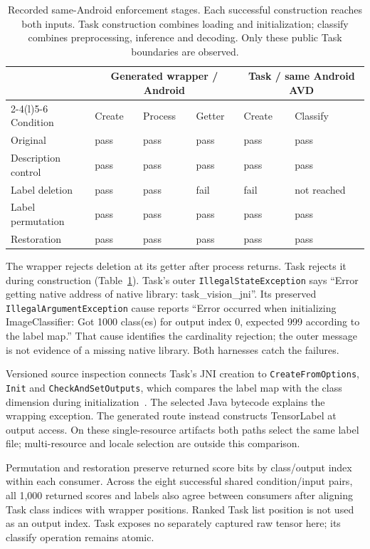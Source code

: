 \documentclass[10pt,twocolumn,letterpaper]{article}
\newcommand{\code}[1]{\texttt{#1}}
\begin{document}
\begin{table}[t]
\centering\small
\setlength{\tabcolsep}{9pt}
\begin{tabular}{@{}llllll@{}}
\toprule
 & \multicolumn{3}{c}{Generated wrapper / Android} & \multicolumn{2}{c}{Task / same Android AVD}\\
\cmidrule(lr){2-4}\cmidrule(l){5-6}
Condition & Create & Process & Getter & Create & Classify\\
\midrule
Original & pass & pass & pass & pass & pass\\
Description control & pass & pass & pass & pass & pass\\
Label deletion & pass & pass & fail & fail & not reached\\
Label permutation & pass & pass & pass & pass & pass\\
Restoration & pass & pass & pass & pass & pass\\
\bottomrule
\end{tabular}
\caption{Recorded same-Android enforcement stages. Each successful construction reaches both inputs. Task construction combines loading and initialization; classify combines preprocessing, inference and decoding. Only these public Task boundaries are observed.}
\label{tab:stages}
\end{table}

The wrapper rejects deletion at its getter after process returns. Task rejects it during construction (Table~\ref{tab:stages}). Task's outer \code{IllegalStateException} says ``Error getting native address of native library: task\_vision\_jni''. Its preserved \code{IllegalArgumentException} cause reports ``Error occurred when initializing ImageClassifier: Got 1000 class(es) for output index 0, expected 999 according to the label map.'' That cause identifies the cardinality rejection; the outer message is not evidence of a missing native library. Both harnesses catch the failures.

Versioned source inspection connects Task's JNI creation to \code{CreateFromOptions}, \code{Init} and \code{CheckAndSetOutputs}, which compares the label map with the class dimension during initialization~\cite{task-classifier}. The selected Java bytecode explains the wrapping exception. The generated route instead constructs TensorLabel at output access. On these single-resource artifacts both paths select the same label file; multi-resource and locale selection are outside this comparison.

Permutation and restoration preserve returned score bits by class/output index within each consumer. Across the eight successful shared condition/input pairs, all 1,000 returned scores and labels also agree between consumers after aligning Task class indices with wrapper positions. Ranked Task list position is not used as an output index. Task exposes no separately captured raw tensor here; its classify operation remains atomic.
\end{document}
